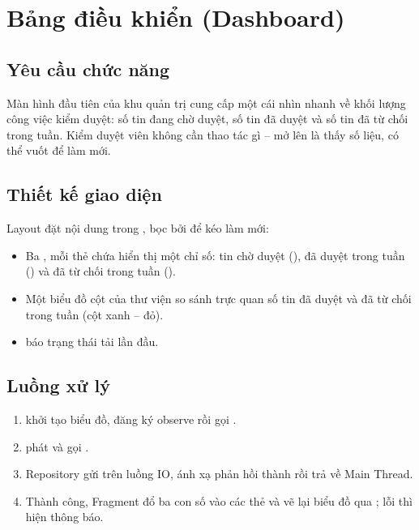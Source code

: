 \section{Bảng điều khiển (Dashboard)}

\subsection{Yêu cầu chức năng}
Màn hình đầu tiên của khu quản trị cung cấp một cái nhìn nhanh về khối lượng
công việc kiểm duyệt: số tin đang chờ duyệt, số tin đã duyệt và số tin đã từ
chối trong tuần. Kiểm duyệt viên không cần thao tác gì -- mở lên là thấy số
liệu, có thể vuốt để làm mới.

\subsection{Thiết kế giao diện}
Layout  đặt nội dung trong
, bọc bởi  để kéo làm mới:
\begin{itemize}
    \item Ba , mỗi thẻ chứa  hiển thị một
    chỉ số: tin chờ duyệt (), đã duyệt trong tuần
    () và đã từ chối trong tuần ().
    \item Một biểu đồ cột  của thư viện  so
    sánh trực quan số tin đã duyệt và đã từ chối trong tuần (cột xanh -- đỏ).
    \item {} báo trạng thái tải lần đầu.
\end{itemize}


\subsection{Luồng xử lý}
\begin{enumerate}
    \item {} khởi tạo biểu đồ, đăng ký observe
     rồi gọi .
    \item {} phát  và gọi
    .
    \item Repository gửi  trên luồng IO, ánh
    xạ phản hồi thành  rồi trả về Main Thread.
    \item Thành công, Fragment đổ ba con số vào các thẻ và vẽ lại biểu đồ qua
    ; lỗi thì hiện  thông báo.
\end{enumerate}

